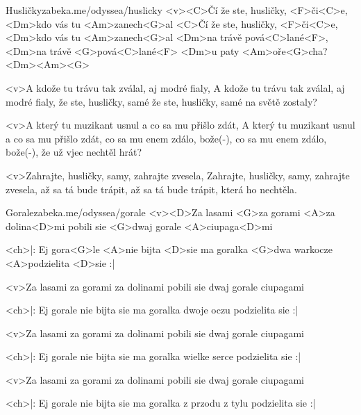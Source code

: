 \begin{song}{57}{Husličky}{zabeka.me/odyssea/huslicky}
<v><C>Čí že ste, husličky, <F>či<C>e, 
<Dm>kdo vás tu <Am>zanech<G>al
<C>Čí že ste, husličky, <F>či<C>e, 
<Dm>kdo vás tu <Am>zanech<G>al
<Dm>na trávě pová<C>lané<F>, 
<Dm>na trávě <G>pová<C>lané<F>
<Dm>u paty <Am>oře<G>cha?<Dm><Am><G>

<v>A kdože tu trávu tak zválal, aj modré fialy,
A kdože tu trávu tak zválal, aj modré fialy,
že ste, husličky, samé 
že ste, husličky, samé na světě zostaly?

<v>A který tu muzikant usnul a co sa mu přišlo zdát,
A který tu muzikant usnul a co sa mu přišlo zdát,
co sa mu enem zdálo, bože(-), 
co sa mu enem zdálo, bože(-), že už vjec nechtěl hrát?

<v>Zahrajte, husličky, samy, zahrajte zvesela,
Zahrajte, husličky, samy, zahrajte zvesela,
až sa tá bude trápit, 
až sa tá bude trápit, která ho nechtěla.
\end{song}
\begin{song}[Čechomor]{58}{Gorale}{zabeka.me/odyssea/gorale}
<v><D>Za lasami <G>za gorami <A>za dolina<D>mi
pobili sie <G>dwaj gorale <A>ciupaga<D>mi

<ch>|: Ej gora<G>le <A>nie bijta <D>sie
ma goralka <G>dwa warkocze
<A>podzielita <D>sie :|

<v>Za lasami za gorami za dolinami
pobili sie dwaj gorale ciupagami

<ch>|: Ej gorale nie bijta sie
ma goralka dwoje oczu
podzielita sie :|

<v>Za lasami za gorami za dolinami
pobili sie dwaj gorale ciupagami

<ch>|: Ej gorale nie bijta sie
ma goralka wielke serce
podzielita sie :|

<v>Za lasami za gorami za dolinami
pobili sie dwaj gorale ciupagami

<ch>|: Ej gorale nie bijta sie
ma goralka z przodu z tylu
podzielita sie :|

\end{song}
